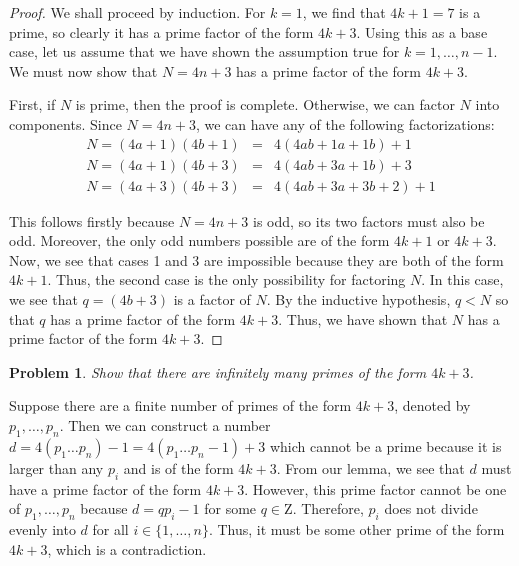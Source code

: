 \documentclass[psamsfonts]{amsart}
\newtheorem{prob}{Problem}[section]
\newenvironment{sol}{{\bfseries Solution}}{\qedsymbol}
\theoremstyle{definition}
\theoremstyle{remark}
\numberwithin{equation}{section}
\begin{document}
\begin{proof}
We shall proceed by induction. For $k=1$, we find that $4k+1 = 7$ is a prime, so clearly it has a prime factor of the form $4k + 3$. Using this as a base case, let us assume that we have shown the assumption true for $k = 1, \ldots, n - 1$. We must now show that $N = 4n + 3$ has a prime factor of the form $4k +3$. 

First, if $N$ is prime, then the proof is complete. Otherwise, we can factor $N$ into components. Since $N = 4n + 3$, we can have any of the following factorizations:
\begin{eqnarray}
N = (4a + 1)(4b + 1) &=& 4(4ab + 1a + 1b) + 1\\
N = (4a + 1)(4b + 3) &=& 4(4ab + 3a + 1b) + 3\\
N = (4a + 3)(4b + 3) &=& 4(4ab + 3a + 3b + 2) + 1 
\end{eqnarray}

This follows firstly because $N = 4n + 3$ is odd, so its two factors must also be odd. Moreover, the only odd numbers possible are of the form $4k + 1$ or $4k + 3$. Now, we see that cases 1 and 3 are impossible because they are both of the form $4k + 1$. Thus, the second case is the only possibility for factoring $N$. In this case, we see that $q = (4b + 3)$ is a factor of $N$. By the inductive hypothesis, $q < N$ so that $q$ has a prime factor of the form $4k + 3$. Thus, we have shown that $N$ has a prime factor of the form $4k + 3$. 
\end{proof}

\begin{prob}
Show that there are infinitely many primes of the form $4k+3$. 
\end{prob}

\begin{sol}
Suppose there are a finite number of primes of the form $4k + 3$, denoted by $p_1, \ldots, p_n$. Then we can construct a number $d = 4 (p_1 \ldots p_n) - 1 = 4(p_1 \ldots p_n - 1) + 3$ which cannot be a prime because it is larger than any $p_i$ and is of the form $4k + 3$. From our lemma, we see that $d$ must have a prime factor of the form $4k + 3$. However, this prime factor cannot be one of $p_1, \ldots, p_n$ because $d = q p_i - 1$ for some $q \in \mathrm{Z}$. Therefore, $p_i$ does not divide evenly into $d$ for all $i \in \{1, \ldots, n\}$. Thus, it must be some other prime of the form $4k + 3$, which is a contradiction.
\end{sol}
\end{document}
